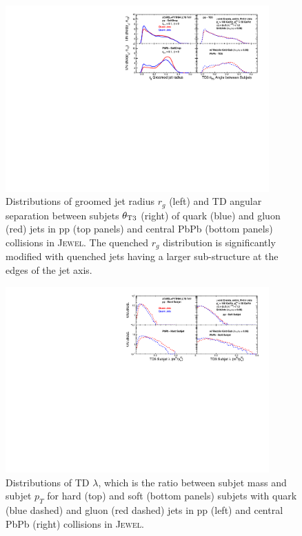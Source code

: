 \documentclass[notoc]{JHEP3}
\begin{document}
\begin{figure}[t]
	   \centering
	   \includegraphics[width=0.9\textwidth]{plots/Comp_rg_new.pdf}
	   \caption{Distributions of groomed jet radius $r_g$ (left) and TD angular separation between subjets $\theta_{\rm T3}$ (right) of quark (blue) and gluon (red) jets in pp (top panels) and central PbPb (bottom panels) collisions in \textsc{Jewel}. The quenched $r_{g}$ distribution is significantly modified with quenched jets having a larger sub-structure at the edges of the jet axis.}
\label{fig:comp_rg}
\end{figure}

\begin{figure}[t]
	   \centering
	   \includegraphics[width=0.9\textwidth]{plots/Comp_lambda_new.pdf}
	   \caption{Distributions of TD $\lambda$, which is the ratio between subjet mass and subjet $p_T$ for hard (top) and soft (bottom panels) subjets with quark (blue dashed) and gluon (red dashed) jets in pp (left) and central PbPb (right) collisions in \textsc{Jewel}. }
\label{fig:comp_subjet_m}
\end{figure}
\end{document}
